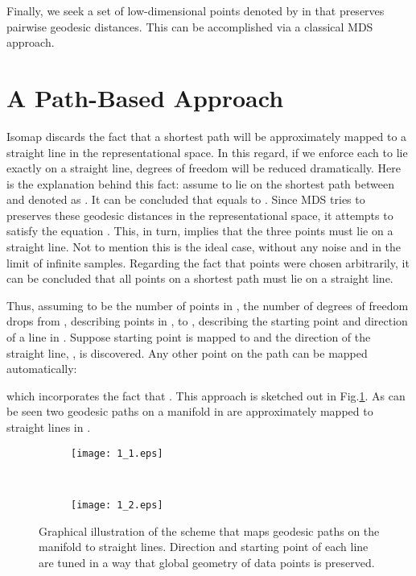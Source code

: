 \documentclass[10pt,journal,cspaper,compsoc]{IEEEtran}
\let\MYoriglatexcaption\caption
\renewcommand{\caption}[2][\relax]{\MYoriglatexcaption[#2]{#2}}
\begin{document}
Finally, we seek a set of low-dimensional points denoted by  in  that preserves pairwise geodesic distances. This can be accomplished via a classical MDS approach.



\section{A Path-Based Approach}
Isomap discards the fact that a shortest path  will be approximately mapped to a straight line in the representational space. In this regard, if we enforce each  to lie exactly on a straight line, degrees of freedom will be reduced dramatically. Here is the explanation behind this fact: assume  to lie on the shortest path between  and  denoted as . It can be concluded that  equals to . Since MDS tries to preserves these geodesic distances in the representational space, it attempts to satisfy the equation . This, in turn, implies that the three points must lie on a straight line. Not to mention this is the ideal case, without any noise and in the limit of infinite samples. Regarding the fact that points were chosen arbitrarily, it can be concluded that all points on a shortest path must lie on a straight line. 

Thus, assuming  to be the number of points in , the number of degrees of freedom drops from , describing  points in , to , describing the starting point and direction of a line in . Suppose starting point  is mapped to  and the direction of the straight line, , is discovered. Any other point on the path  can be mapped automatically: 

which incorporates the fact that . This approach is sketched out in Fig.\ref{fig_1_1}. As can be seen two geodesic paths on a manifold in  are approximately mapped to straight lines in .

\begin{figure}[t]
\centering
        \begin{subfigure}[b]{0.22\textwidth}
                \texttt{[image: 1\_1.eps]}
\end{subfigure}~
\begin{subfigure}[b]{0.22\textwidth}
                \texttt{[image: 1\_2.eps]}
\end{subfigure}\caption{{\small Graphical illustration of the scheme that maps geodesic paths on the manifold to straight lines. Direction and starting point of each line are tuned in a way that global geometry of data points is preserved.}}\label{fig_1_1}
\end{figure}
\end{document}
